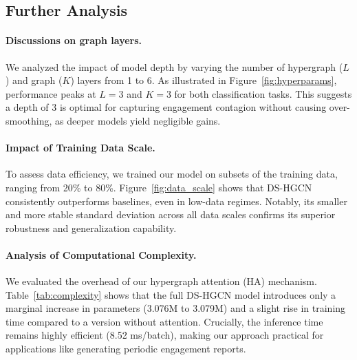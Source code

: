 \documentclass[runningheads]{llncs}
\begin{document}
\subsection{Further Analysis}\label{sec:further_analysis}
\paragraph{\textbf{Discussions on graph layers.}} We analyzed the impact of model depth by varying the number of hypergraph ($L$) and graph ($K$) layers from 1 to 6. As illustrated in Figure~\ref{fig:hyperparams}, performance peaks at $L=3$ and $K=3$ for both classification tasks. This suggests a depth of 3 is optimal for capturing engagement contagion without causing over-smoothing, as deeper models yield negligible gains.
\paragraph{\textbf{Impact of Training Data Scale.}} To assess data efficiency, we trained our model on subsets of the training data, ranging from 20\% to 80\%. Figure~\ref{fig:data_scale} shows that DS-HGCN consistently outperforms baselines, even in low-data regimes. Notably, its smaller and more stable standard deviation across all data scales confirms its superior robustness and generalization capability.
\paragraph{\textbf{Analysis of Computational Complexity.}} We evaluated the overhead of our hypergraph attention (HA) mechanism. Table~\ref{tab:complexity} shows that the full DS-HGCN model introduces only a marginal increase in parameters (3.076M to 3.079M) and a slight rise in training time compared to a version without attention. Crucially, the inference time remains highly efficient (8.52 ms/batch), making our approach practical for applications like generating periodic engagement reports.

\begin{table}[h]
	\caption{Comparison of computational costs and efficiency.}
	\centering
	
	\label{tab:complexity}
\end{table}
\end{document}
